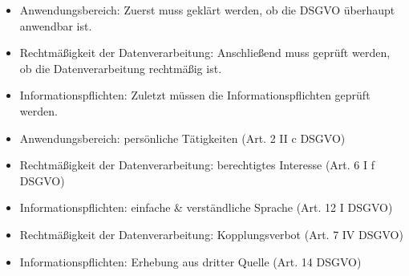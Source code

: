 \documentclass{article}
\begin{document}
\begin{solutions}
  \item
  \begin{itemize}
    \item Anwendungsbereich: Zuerst muss geklärt werden, ob die DSGVO überhaupt anwendbar ist.
    \item Rechtmäßigkeit der Datenverarbeitung: Anschließend muss geprüft werden, ob die Datenverarbeitung rechtmäßig ist.
    \item Informationspflichten: Zuletzt müssen die Informationspflichten geprüft werden.
  \end{itemize}
  \item
  \begin{itemize}
    \item Anwendungsbereich: persönliche Tätigkeiten (Art. 2 II c DSGVO)
    \item Rechtmäßigkeit der Datenverarbeitung: berechtigtes Interesse (Art. 6 I f DSGVO)
    \item Informationspflichten: einfache \& verständliche Sprache (Art. 12 I DSGVO)
    \item Rechtmäßigkeit der Datenverarbeitung: Kopplungsverbot (Art. 7 IV DSGVO)
    \item Informationspflichten: Erhebung aus dritter Quelle (Art. 14 DSGVO)
  \end{itemize}
\end{solutions}
\end{document}

